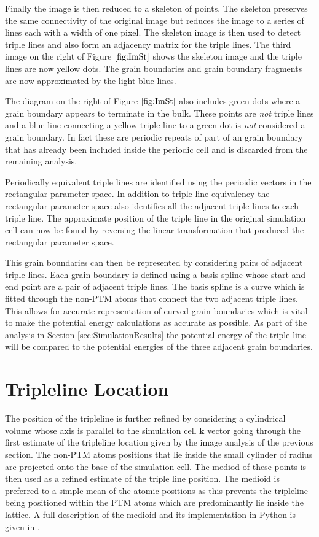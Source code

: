 \documentclass[12pt,a4paper]{book}
\begin{document}
Finally the image is then reduced to a skeleton of points. The skeleton preserves the same connectivity of the original image but reduces the image to a series of lines each with a width of one pixel. The skeleton image is then used to detect triple lines and also form an adjacency matrix for the triple lines. The third image on the right of Figure $\ref{fig:ImSt}$ shows the skeleton image and the triple lines are now yellow dots. The grain boundaries and grain boundary fragments are now approximated by the light blue lines.

The diagram on the right of Figure $\ref{fig:ImSt}$ also includes green dots  where a grain boundary appears to terminate in the bulk. These points are \emph{not} triple lines and a blue line connecting a yellow triple line to a green dot is \emph{not} considered a grain boundary. In fact these are periodic repeats of part of an grain boundary that has already been included inside the periodic cell and is discarded from the remaining analysis.
 
Periodically equivalent triple lines are identified using the perioidic vectors in the rectangular parameter space. In addition to triple line equivalency the rectangular parameter space also identifies all the adjacent triple lines to each triple line. 
The approximate position of the triple line in the original simulation cell can now be found by reversing the linear transformation that produced the rectangular parameter space.

This grain boundaries can then be represented by considering pairs of adjacent triple lines. Each grain boundary is defined using a basis spline whose start and end point are a pair of adjacent triple lines. The basis spline is a curve which is fitted through the non-PTM atoms that connect the two adjacent triple lines. This allows for accurate representation of curved grain boundaries which is vital to make the potential energy calculations as accurate as possible. As part of the analysis in Section \ref{sec:SimulationResults} the potential energy of the triple line will be compared to the potential energies of the three adjacent grain boundaries.  


\section{Tripleline Location} \label{sec:TJLocation}

The position of the tripleline is further refined by considering a cylindrical volume whose axis is parallel to the simulation cell $\mathbf{k}$ vector going through the first estimate of the tripleline location given by the image analysis of the previous section. The non-PTM atoms positions that lie inside the small cylinder of radius are projected onto the base of the simulation cell. The mediod of these points is then used as a refined estimate of the triple line position. The medioid is preferred to a simple mean of the atomic positions as this prevents the tripleline being positioned within the PTM atoms which are predominantly lie inside the lattice. A full description of the medioid and its implementation in Python is given in \cite{Bauckhage2015}. 
\end{document}
